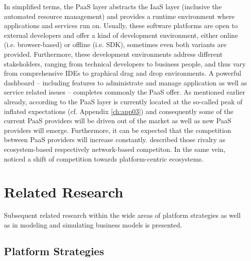In simplified terms, the \ac{PaaS} layer abstracts the \ac{IaaS} layer (inclusive the automated resource management) and provides a runtime environment where applications and services run on. Usually, these software platforms are open to external developers and offer a kind of development environment, either online (i.e. browser-based) or offline (i.e. \ac{SDK}), sometimes even both variants are provided. Furthermore, these development environments address different stakeholders, ranging from technical developers to business people, and thus vary from comprehensive \acp{IDE} to graphical drag and drop environments. A powerful dashboard -- including features to administrate and manage application as well as service related issues -- completes commonly the \ac{PaaS} offer.
As mentioned earlier already, according to \citet[p. 5]{Smith2012} the \ac{PaaS} layer is currently located at the so-called peak of inflated expectations (cf. Appendix \ref{ch:app03}) and consequently some of the current \ac{PaaS} providers will be driven out of the market as well as new \ac{PaaS} providers will emerge. Furthermore, it can be expected that the competition between \ac{PaaS} providers will increase constantly. \citet[pp. 117,128-129]{Iyer2010} described those rivalry as ecosystem-based respectively network-based competiton. In the same vein, \citet[pp. 675-676]{Tiwana2010} noticed a shift of competition towards platform-centric ecosystems.

\section{Related Research}\label{ch:tf:rw}

Subsequent related research within the wide areas of platform strategies as well as in modeling and simulating business models is presented.

\subsection{Platform Strategies}\label{ch:tf:rw:ps}

